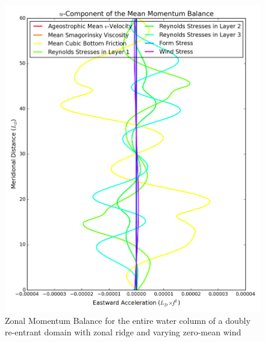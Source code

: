 \documentclass[12pt,a4paper]{report}
\begin{document}
\begin{figure}
\begin{minipage}[b]{0.45\linewidth}
 		\includegraphics[width=\linewidth ]{umom_4}
 		\caption{Zonal Momentum Balance for the entire water column of 
 			a doubly re-entrant domain with 
 			zonal ridge and varying zero-mean wind}
 		\label{fig:umomtotal}
 	\end{minipage}
 \end{figure}
 
\end{document}
